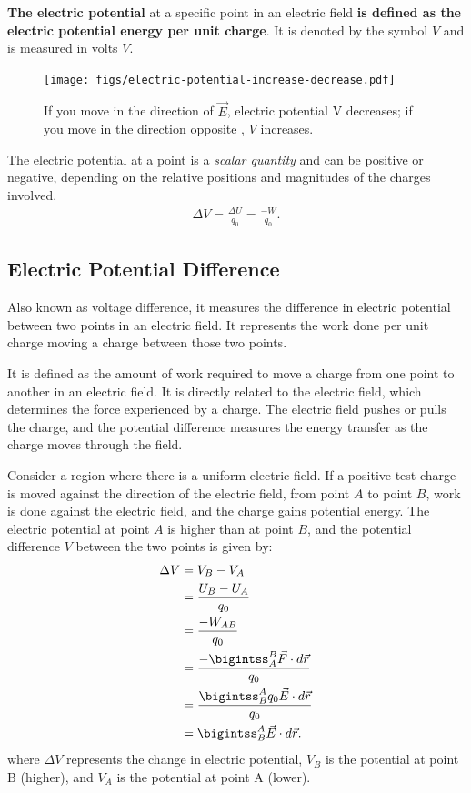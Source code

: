 \documentclass[12pt,b4paper]{article}
\begin{document}
\textbf{The electric potential} at a specific point in an electric field \textbf{is defined as the electric potential energy per unit charge}. It is denoted by the symbol $V$ and is measured in volts $V$. 
\begin{figure}[H]
    \centering
    \texttt{[image: figs/electric-potential-increase-decrease.pdf]}
    \caption{If you move in the direction of $\vec{E}$, electric potential V decreases; if you move in the direction opposite , $V$ increases.}
    \label{fig:potential-change-direction}
\end{figure}
The electric potential at a point is a \textit{scalar quantity} and can be positive or negative, depending on the relative positions and magnitudes of the charges involved.
\begin{align}
    \Delta V=\frac{\Delta U}{q_0}=\frac{-W}{q_0}.
\end{align}
\subsection{Electric Potential Difference}
Also known as voltage difference, it measures the difference in electric potential between two points in an electric field. It represents the work done per unit charge moving a charge between those two points.

It is defined as the amount of work required to move a charge from one point to another in an electric field. It is directly related to the electric field, which determines the force experienced by a charge. The electric field pushes or pulls the charge, and the potential difference measures the energy transfer as the charge moves through the field.

Consider a region where there is a uniform electric field. If a positive test charge is moved against the direction of the electric field, from point $A$ to point $B$, work is done against the electric field, and the charge gains potential energy. The electric potential at point $A$ is higher than at point $B$, and the potential difference $V$ between the two points is given by:
\begin{align}
    \Delta V&=V_B - V_A \notag\\
    &= \frac{U_B-U_A}{q_0}\notag\\
    &=\frac{-W_{AB}}{q_0}\\
    &=\frac{\displaystyle-\bigintss_A^B \vec{F}\cdot d\vec{r}}{q_0}\notag\\
    &=\frac{\displaystyle\bigintss_B^A q_0\vec{E}\cdot d\vec{r}}{q_0}\notag\\
    &=\bigintss_B^A\vec{E}\cdot d\vec{r}.
\end{align}
where $\Delta V$ represents the change in electric potential, $V_B$ is the potential at point B (higher), and $V_A$ is the potential at point A (lower).
\end{document}
